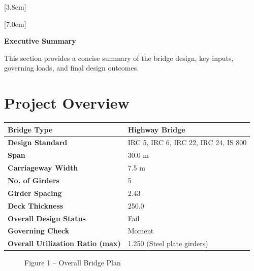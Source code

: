\documentclass[12pt,a4paper]{report}
\numberwithin{table}{chapter}
\numberwithin{figure}{chapter}
\begin{document}
[3.8em]
  {\normalfont}
  {\contentslabel{2.3em}}
  {\hspace*{-2.3em}}
  {\hfill\contentspage}

[7.0em]
  {\normalfont}
  {\contentslabel{3.2em}}
  {\hspace*{-3.2em}}
  {\hfill\contentspage}

\newpage
\renewcommand{\contentsname}{\centering\Large\bfseries Table of Contents}
\tableofcontents


\newpage
{\centering\Large\bfseries Executive Summary\par}
\vspace{0.8em}

This section provides a concise summary of the bridge design, key inputs, governing loads, and final design outcomes.

\section*{Project Overview}
\label{sec:project-overview}


\begin{tabular}{|L{5.5cm}|L{8.5cm}|}
\hline
\textbf{Bridge Type} & Highway Bridge \\
\hline
\textbf{Design Standard} & IRC 5, IRC 6, IRC 22, IRC 24, IS 800 \\
\hline
\textbf{Span} & 30.0 m \\
\hline
\textbf{Carriageway Width} & 7.5 m \\
\hline
\textbf{No. of Girders} & 5 \\
\hline
\textbf{Girder Spacing} & 2.43 \\
\hline
\textbf{Deck Thickness} & 250.0 \\
\hline
\textbf{Overall Design Status} & Fail \\
\hline
\textbf{Governing Check} & Moment \\
\hline
\textbf{Overall Utilization Ratio (max)} & 1.250 (Steel plate girders) \\
\hline
\end{tabular}


\begin{figure}[H]
\centering
{}
\caption*{Figure 1 -- Overall Bridge Plan}
\end{figure}
\end{document}
